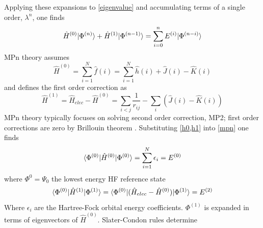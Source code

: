        Applying these expansions to \cref{eigenvalue} and accumulating terms of a single order, $\lambda^n$, one finds
         \begin{equation}\label{mpn}
         	  \hat{H}^{(0)}| \Phi^{(n)} \rangle + \hat{H}^{(1)}| \Phi^{(n-1)} \rangle = \sum_{i=0}^n E^{(i)} | \Phi^{(n-i)} \rangle
        \end{equation}  
      MPn theory assumes %
        \begin{equation}\label{h0}
          \hat{H}^{(0)} = \sum_{i=1}^N \hat{f}(i) = \sum_{i=1}^N \hat{h}(i) + \hat{J}(i) - \hat{K}(i)
        \end{equation}
      and defines the first order correction as 
        \begin{equation}\label{h1}
          \hat{H}^{(1)} = \hat{H}_{elec} - \hat{H}^{(0)} = \sum_{i<j} \frac{1}{r_{ij}} - \sum_i (\hat{J}(i) - \hat{K}(i))
        \end{equation}
      MPn theory typically focuses on solving second order correction, MP2; first order corrections are zero by Brillouin theorem \cite{surjan 1989}.  Substituting \cref{h0,h1} into \cref{mpn} one finds 
        \begin{equation}
          \langle\Phi^{(0)} |\hat{H}^{(0)}| \Phi^{(0)} \rangle = \sum_{i=1}^N \epsilon_i = E^{(0)}
        \end{equation}
        where $\Phi^{0} = \Psi_0$ the lowest energy HF reference state 
        \begin{equation}
           \langle\Phi^{(0)} |\hat{H}^{(1)}| \Phi^{(1)} \rangle =\langle\Phi^{(0)} |(\hat{H}_{elec} - \hat{H}^{(0)}) | \Phi^{(1)} \rangle  =  E^{(2)}
         \end{equation}
       Where $\epsilon_i$ are the Hartree-Fock orbital energy coefficients. $\Phi^{(1)}$ is expanded in terms of eigenvectors of $\hat{H}^{(0)}$.  Slater-Condon rules\cite{Szabo 1982} determine %
